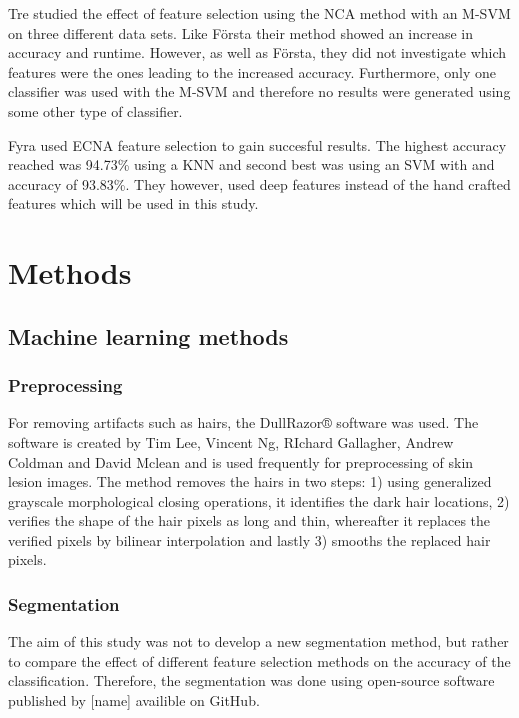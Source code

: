 \documentclass{kththesis}
\begin{document}
Tre studied the effect of feature selection using the NCA method with an M-SVM on three different data sets. Like Första their method showed an increase in accuracy and runtime. However, as well as Första, they did not investigate which features were the ones leading to the increased accuracy. Furthermore, only one classifier was used with the M-SVM and therefore no results were generated using some other type of classifier. 

Fyra used ECNA feature selection to gain succesful results. The highest accuracy reached was 94.73\% using a KNN and second best was using an SVM with and accuracy of 93.83\%. They however, used deep features instead of the hand crafted features which will be used in this study.


\chapter{Methods}

\section{Machine learning methods}

\subsection{Preprocessing}

For removing artifacts such as hairs, the DullRazor® software was used. The software is created by Tim Lee, Vincent Ng, RIchard Gallagher, Andrew Coldman and David Mclean and is used frequently for preprocessing of skin lesion images. The method removes the hairs in two steps: 1) using generalized grayscale morphological closing operations, it identifies the dark hair locations, 2) verifies the shape of the hair pixels as long and thin, whereafter it replaces the verified pixels by bilinear interpolation and lastly 3) smooths the replaced hair pixels. %


\subsection{Segmentation}

The aim of this study was not to develop a new segmentation method, but rather to compare the effect of different feature selection methods on the accuracy of the classification. Therefore, the segmentation was done using open-source software published by [name] availible on GitHub. 
\end{document}
